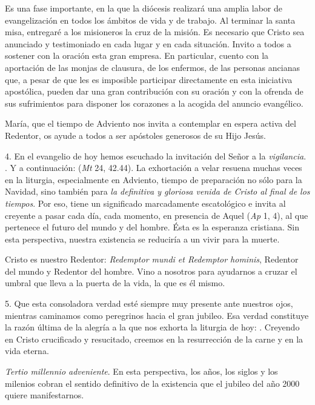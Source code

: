 Es una fase importante, en la que la diócesis realizará una amplia labor de evangelización en todos los ámbitos de vida y de trabajo. Al terminar la santa misa, entregaré a los misioneros la cruz de la misión. Es necesario que Cristo sea anunciado y testimoniado en cada lugar y en cada situación. Invito a todos a sostener con la oración esta gran empresa. En particular, cuento con la aportación de las monjas de clausura, de los enfermos, de las personas ancianas que, a pesar de que les es imposible participar directamente en esta iniciativa apostólica, pueden dar una gran contribución con su oración y con la ofrenda de sus sufrimientos para disponer los corazones a la acogida del anuncio evangélico.

María, que el tiempo de Adviento nos invita a contemplar en espera activa del Redentor, os ayude a todos a ser apóstoles generosos de su Hijo Jesús.

4. En el evangelio de hoy hemos escuchado la invitación del Señor a la \emph{vigilancia}. . Y a continuación:  (\emph{Mt} 24, 42.44). La exhortación a velar resuena muchas veces en la liturgia, especialmente en Adviento, tiempo de preparación no sólo para la Navidad, sino también para \emph{la definitiva y gloriosa venida de Cristo al final de los tiempos}. Por eso, tiene un significado marcadamente escatológico e invita al creyente a pasar cada día, cada momento, en presencia de Aquel  (\emph{Ap} 1, 4), al que pertenece el futuro del mundo y del hombre. Ésta es la esperanza cristiana. Sin esta perspectiva, nuestra existencia se reduciría a un vivir para la muerte.

Cristo es nuestro Redentor: \emph{Redemptor mundi et Redemptor hominis}, Redentor del mundo y Redentor del hombre. Vino a nosotros para ayudarnos a cruzar el umbral que lleva a la puerta de la vida, la  que es él mismo.

5. Que esta consoladora verdad esté siempre muy presente ante nuestros ojos, mientras caminamos como peregrinos hacia el gran jubileo. Esa verdad constituye la razón última de la alegría a la que nos exhorta la liturgia de hoy: . Creyendo en Cristo crucificado y resucitado, creemos en la resurrección de la carne y en la vida eterna.

\emph{Tertio millennio adveniente}. En esta perspectiva, los años, los siglos y los milenios cobran el sentido definitivo de la existencia que el jubileo del año 2000 quiere manifestarnos.

